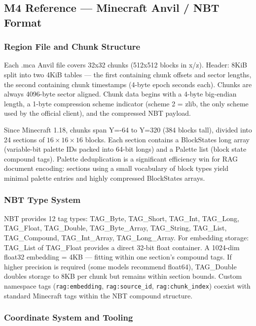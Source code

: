 \documentclass[11pt,letterpaper]{article}
\begin{document}
\subsection{M4 Reference --- Minecraft Anvil / NBT Format}

\subsubsection{Region File and Chunk Structure}

Each .mca Anvil file covers 32x32 chunks (512x512 blocks in x/z). Header: 8KiB split into two 4KiB tables --- the first containing chunk offsets and sector lengths, the second containing chunk timestamps (4-byte epoch seconds each). Chunks are always 4096-byte sector aligned. Chunk data begins with a 4-byte big-endian length, a 1-byte compression scheme indicator (scheme 2 = zlib, the only scheme used by the official client), and the compressed NBT payload.

Since Minecraft 1.18, chunks span Y=-64 to Y=320 (384 blocks tall), divided into 24 sections of $16\times16\times16$ blocks. Each section contains a BlockStates long array (variable-bit palette IDs packed into 64-bit longs) and a Palette list (block state compound tags). Palette deduplication is a significant efficiency win for RAG document encoding: sections using a small vocabulary of block types yield minimal palette entries and highly compressed BlockStates arrays.

\subsubsection{NBT Type System}

NBT provides 12 tag types: TAG\_Byte, TAG\_Short, TAG\_Int, TAG\_Long, TAG\_Float, TAG\_Double, TAG\_Byte\_Array, TAG\_String, TAG\_List, TAG\_Compound, TAG\_Int\_Array, TAG\_Long\_Array. For embedding storage: TAG\_List of TAG\_Float provides a direct 32-bit float container. A 1024-dim float32 embedding = 4KB --- fitting within one section's compound tags. If higher precision is required (some models recommend float64), TAG\_Double doubles storage to 8KB per chunk but remains within section bounds. Custom namespace tags (\texttt{rag:embedding}, \texttt{rag:source\_id}, \texttt{rag:chunk\_index}) coexist with standard Minecraft tags within the NBT compound structure.

\subsubsection{Coordinate System and Tooling}
\end{document}
